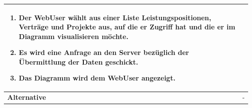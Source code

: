 \begin{longtable}[c]{|p{4cm}|p{10cm}|}
\begin{enumerate}
        \item Der WebUser wählt aus einer Liste Leistungspositionen, Verträge und Projekte aus, auf die er Zugriff hat und die er im Diagramm visualisieren möchte.
        \item Es wird eine Anfrage an den Server bezüglich der Übermittlung der Daten geschickt.
        \item Das Diagramm wird dem WebUser angezeigt.
    \end{enumerate}                                                                                                                                                                                                                                 \\ \hline

    \textbf{Alternative}                & -                                                                                                                                                                                                                    \\ \hline


\end{longtable}
